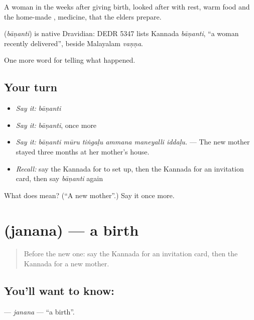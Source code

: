 A woman in the weeks after giving birth, looked after with rest, warm food and the home-made , medicine, that the elders prepare.

\begin{cousinweb}
\textbf{} (\emph{bāṇanti}) is native Dravidian: DEDR 5347 lists Kannada \emph{bāṇanti}, \textquotedblleft{}a woman recently delivered\textquotedblright{}, beside Malayalam \emph{vaṇṇa}.
\end{cousinweb}

\begin{grammarlens}[title={What you've built}]
One more word for telling what happened.
\end{grammarlens}

\subsection*{Your turn}
\begin{itemize}
\raggedright
  \item \emph{Say it:} \emph{bāṇanti}
  \item \emph{Say it:} \emph{bāṇanti}, once more
  \item \emph{Say it:} \emph{bāṇanti mūru tiṅgaḷu ammana maneyalli iddaḷu.} — The new mother stayed three months at her mother's house.
  \item \emph{Recall:} say the Kannada for to set up, then the Kannada for an invitation card, then say \emph{bāṇanti} again
\end{itemize}

\begin{tcolorbox}[breakable,colback=teal!4,colframe=teal!35!black,title={Before you move on}]
What does  mean? (\textquotedblleft{}A new mother\textquotedblright{}.) Say it once more.
\end{tcolorbox}
\section[\texorpdfstring{\kn{ಜನನ} (janana)}{ಜನನ (janana)}]{ (janana) — a birth}

\label{lesson:KA-C334-janana}



\begin{quote}
Before the new one: say the Kannada for an invitation card, then the Kannada for a new mother.
\end{quote}

\subsection*{You'll want to know: }
\textbf{} — \emph{janana} — \textquotedblleft{}a birth\textquotedblright{}.

